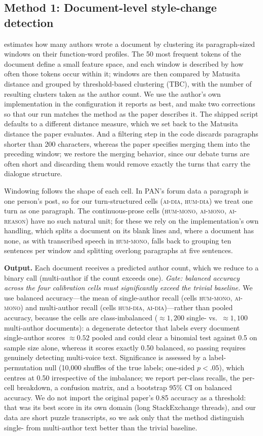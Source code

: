 \documentclass[11pt]{article}
\newcommand{\cellhm}{\textsc{hum-mono}}
\newcommand{\cellhd}{\textsc{hum-dia}}
\newcommand{\cellad}{\textsc{ai-dia}}
\newcommand{\cellam}{\textsc{ai-mono}}
\newcommand{\cellrt}{\textsc{ai-reason}}
\begin{document}
\subsection{Method 1: Document-level style-change detection}
\label{sec:method1}

\citet{nath2019style} estimates how many authors wrote a document by
clustering its paragraph-sized windows on their function-word profiles. The 50
most frequent tokens of the document define a small feature space, and each
window is described by how often those tokens occur within it; windows are
then compared by Matusita distance and grouped by threshold-based clustering
(TBC), with the number of resulting clusters taken as the author count. We use
the author's own implementation in the configuration it reports as best, and
make two corrections so that our run matches the method as the paper describes
it. The shipped script defaults to a different distance measure, which we set
back to the Matusita distance the paper evaluates. And a filtering step in the
code discards paragraphs shorter than 200 characters, whereas the paper
specifies merging them into the preceding window; we restore the merging
behavior, since our debate turns are often short and discarding them would
remove exactly the turns that carry the dialogue structure.

Windowing follows the shape of each cell. In PAN's forum data a paragraph is
one person's post, so for our turn-structured cells (\cellad{}, \cellhd{}) we
treat one turn as one paragraph. The continuous-prose cells (\cellhm{},
\cellam{}, \cellrt{}) have no such natural unit; for these we rely on the
implementation's own handling, which splits a document on its blank lines and,
where a document has none, as with transcribed speech in \cellhm{}, falls
back to grouping ten sentences per window and splitting overlong paragraphs at
five sentences.

\textbf{Output.} Each document receives a predicted author count, which we
reduce to a binary call (multi-author if the count exceeds one).
\emph{Gate: balanced accuracy across the four calibration cells must
significantly exceed the trivial baseline.} We use balanced accuracy---the
mean of single-author recall (cells \cellhm{}, \cellam{}) and multi-author
recall (cells \cellhd{}, \cellad{})---rather than pooled accuracy, because the
cells are class-imbalanced (${\approx}1{,}200$ single- vs.\ ${\approx}1{,}100$
multi-author documents): a degenerate detector that labels every document
single-author scores ${\approx}0.52$ pooled and could clear a binomial test
against 0.5 on sample size alone, whereas it scores exactly 0.50 balanced, so
passing requires genuinely detecting multi-voice text. Significance is assessed
by a label-permutation null (10{,}000 shuffles of the true labels; one-sided
$p<.05$), which centres at 0.50 irrespective of the imbalance; we report
per-class recalls, the per-cell breakdown, a confusion matrix, and a bootstrap
95\% CI on balanced accuracy. We do not import the original paper's 0.85
accuracy as a threshold: that was its best score in its own domain (long
StackExchange threads), and our data are short puzzle transcripts, so we ask
only that the method distinguish single- from multi-author text better than the
trivial baseline.
\end{document}
